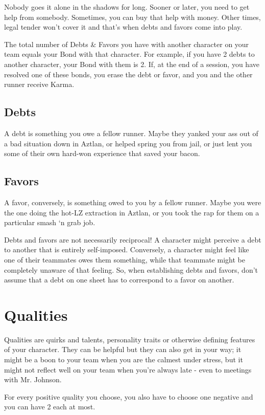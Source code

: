 Nobody goes it alone in the shadows for long. Sooner or later, you need to get help from somebody. Sometimes, you can buy that help with money. Other times, legal tender won’t cover it and that’s when debts and favors come into play.

The total number of Debts \& Favors you have with another character on your team equals your Bond with that character. For example, if you have 2 debts to another character, your Bond with them is 2. If, at the end of a session, you have resolved one of these bonds, you erase the debt or favor, and you and the other runner receive Karma.

\subsection{Debts}
A debt is something you owe a fellow runner. Maybe they yanked your ass out of a bad situation down in Aztlan, or helped spring you from jail, or just lent you some of their own hard-won experience that saved your bacon.

\subsection{Favors}
A favor, conversely, is something owed to you by a fellow runner. Maybe you were the one doing the hot-LZ extraction in Aztlan, or you took the rap for them on a particular smash ‘n grab job.

Debts and favors are not necessarily reciprocal! A character might perceive a debt to another that is entirely self-imposed. Conversely, a character might feel like one of their teammates owes them something, while that teammate might be completely unaware of that feeling. So, when establishing debts and favors, don’t assume that a debt on one sheet has to correspond to a favor on another.



\section{Qualities}

Qualities are quirks and talents, personality traits or otherwise defining features of your character. They can be helpful but they can also get in your way; it might be a boon to your team when you are the calmest under stress, but it might not reflect well on your team when you're always late - even to meetings with Mr. Johnson.

For every positive quality you choose, you also have to choose one negative and you can have 2 each at most. 

